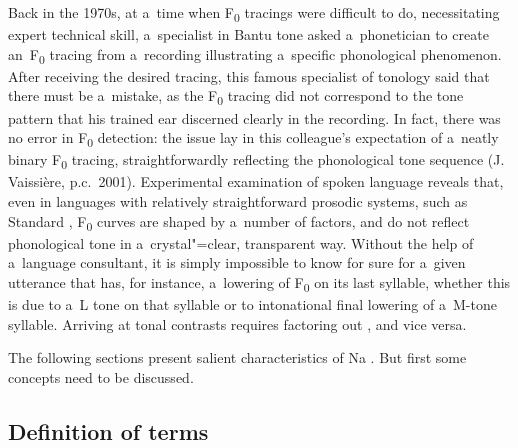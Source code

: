 Back in the 1970s, at a~time when F\textsubscript{0} tracings were difficult to do, necessitating expert technical skill, a~specialist in Bantu tone asked a~phonetician to create an~F\textsubscript{0}
tracing from a~recording illustrating a~specific phonological phenomenon. After receiving the
desired tracing, this famous specialist of tonology said that there must be a~mistake, as the F\textsubscript{0}
tracing did not correspond to the tone pattern that his trained ear discerned clearly in the
recording. In fact, there was no error in F\textsubscript{0} detection: the issue lay in this colleague’s
expectation of a~neatly binary F\textsubscript{0} tracing, straightforwardly reflecting the phonological tone
sequence (J. Vaissière, p.c.\ 2001). Experimental examination of spoken language reveals that, even in languages with
relatively straightforward prosodic systems, such as Standard , F\textsubscript{0} curves are shaped by
a~number of factors, and do not reflect phonological tone in a~crystal"=clear, transparent
way. Without the help of a~language consultant, it is simply impossible to know for sure for a~given
utterance that has, for instance, a~lowering of F\textsubscript{0} on its last
syllable, whether this is due to a~L tone on that syllable or to intonational final lowering of
a~M-tone syllable. Arriving at tonal contrasts requires factoring out , and vice versa.


The following sections present salient characteristics of Na . But first some concepts need
to be discussed.




\subsection{Definition of terms}
\label{sec:definitionofterms}


